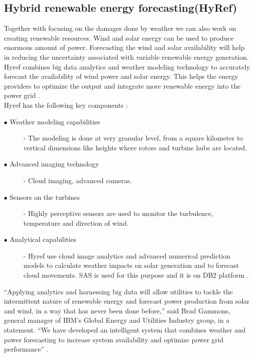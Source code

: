 \documentclass[sigconf]{acmart}
\begin{document}
\subsection{Hybrid renewable energy forecasting(HyRef)}


Together with focusing on the damages done by weather we can also work on creating renewable resources. Wind and solar energy can be used to produce enormous amount of power. Forecasting the wind and solar availability will help in reducing the uncertainty associated with variable renewable energy generation.
Hyref combines big data analytics and weather modeling technology to accurately forecast the availability of wind power and solar energy. This helps the  energy providers to optimize the output and integrate more renewable energy into the power grid \cite{Hyref02}.\\

Hyref has the following key components :\\

\begin{description}

\item [$\bullet$ Weather modeling capabilities]- The modeling is done at very granular level, from a square kilometer to vertical dimensions like heights where rotors and turbine hubs are located.

\item [$\bullet$ Advanced imaging technology]- Cloud imaging, advanced cameras.

\item [$\bullet$ Sensors on the turbines]- Highly perceptive sensors are used to monitor the turbulence, temperature and direction of wind.

\item [$\bullet$ Analytical capabilities]- Hyref use cloud image analytics and advanced numerical prediction models to calculate weather impacts on solar generation and to forecast cloud movements. SAS is used for this purpose and it is on DB2 platform \cite{Hyref04}.\\

\end{description}


``Applying analytics and harnessing big data will allow utilities to tackle the intermittent nature of renewable energy and forecast power production from solar and wind, in a way that has never been done before,'' said Brad Gammons, general manager of IBM's Global Energy and Utilities Industry group, in a statement. ``We have developed an intelligent system that combines weather and power forecasting to increase system availability and optimize power grid performance'' \cite{Hyref03}.
\end{document}
